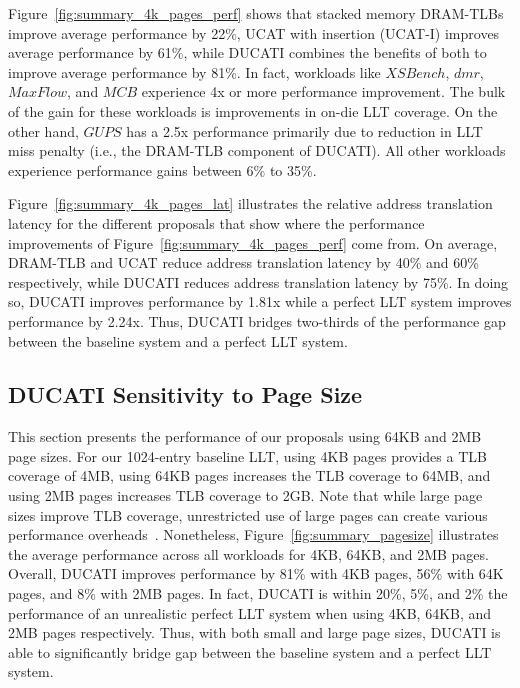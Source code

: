 Figure~\ref{fig:summary_4k_pages_perf} shows that stacked memory DRAM-TLBs
improve average performance by 22\%,
UCAT with insertion (UCAT-I) improves average performance by 61\%,
while DUCATI combines the benefits of both to improve average
performance by 81\%. In fact, workloads like $XSBench$, $dmr$,
$MaxFlow$, and $MCB$ experience 4x or more performance improvement.
The bulk of the gain for these workloads is improvements in on-die LLT
coverage. On the other hand, $GUPS$ has a 2.5x performance primarily
due to reduction in LLT miss penalty (i.e., the DRAM-TLB component of
DUCATI). All other workloads experience performance gains between 6\%
to 35\%.

Figure~\ref{fig:summary_4k_pages_lat} illustrates the relative address
translation latency for the different proposals that show where the
performance improvements of Figure~\ref{fig:summary_4k_pages_perf}
come from. On average, DRAM-TLB and UCAT reduce address translation
latency by 40\% and 60\% respectively, while DUCATI reduces address
translation latency by 75\%. In doing so, DUCATI improves performance
by 1.81x while a perfect LLT system improves performance by 2.24x.
Thus, DUCATI bridges two-thirds of the performance gap between the
baseline system and a perfect LLT system.




\subsection{DUCATI Sensitivity to Page Size}

\noindent This section presents the performance of our proposals using
64KB and 2MB page sizes. For our 1024-entry baseline LLT, using 4KB
pages provides a TLB coverage of 4MB, using 64KB pages increases the
TLB coverage to 64MB, and using 2MB pages increases TLB coverage to
2GB. Note that while large page sizes improve TLB coverage,
unrestricted use of large pages can create various performance
overheads~\cite{SuperPageProblem,TwoPageSize,numa-harmful,cameo,largepagevm}.
Nonetheless, Figure~\ref{fig:summary_pagesize} illustrates the average
performance across all workloads for 4KB, 64KB, and 2MB pages.
Overall, DUCATI improves performance by 81\% with 4KB pages, 56\% with
64K pages, and 8\% with 2MB pages. In fact, DUCATI is within 20\%,
5\%, and 2\% the performance of an unrealistic perfect LLT system when
using 4KB, 64KB, and 2MB pages respectively. Thus, with both small and
large page sizes, DUCATI is able to significantly bridge gap between
the baseline system and a perfect LLT system.

